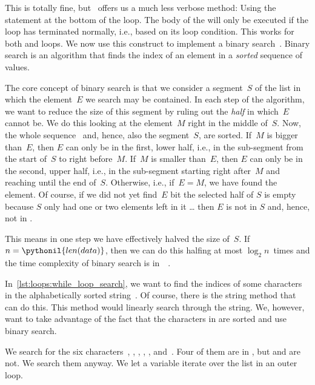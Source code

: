This is totally fine, but \python\ offers us a much less verbose method:
Using the  statement at the bottom of the loop.
The body of the  will only be executed if the loop has terminated normally, i.e., based on its loop condition.
This works for both  and  loops\cite{PSF:P3D:TPT:MCFT}.%
%
%
%
%
%
%
%
We now use this construct to implement a binary search~\cite{K1998SAS,H2024POIC:BS,B1999PP}.
Binary search is an algorithm that finds the index of an element in a \emph{sorted} sequence  of values.

The core concept of binary search is that we consider a segment~$S$ of the list in which the element~$E$ we search may be contained.
In each step of the algorithm, we want to reduce the size of this segment by ruling out the \emph{half} in which~$E$ cannot be.
We do this looking at the element~$M$ right in the middle of~$S$.
Now, the whole sequence~ and, hence, also the segment~$S$, are sorted.
If~$M$ is bigger than~$E$, then $E$ can only be in the first, lower half, i.e., in the sub-segment from the start of~$S$ to right before~$M$.
If~$M$ is smaller than~$E$, then $E$ can only be in the second, upper half, i.e., in the sub-segment starting right after~$M$ and reaching until the end of~$S$.
Otherwise, i.e., if~$E=M$, we have found the element.
Of course, if we did not yet find~$E$ bit the selected half of $S$ is empty because $S$ only had one or two elements left in it {\dots} then $E$ is not in $S$ and, hence, not in .

This means in one step we have effectively halved the size of~$S$.
If~$n=\pythonil{len(data)}$, then we can do this halfing at most $\log_2 n$~times and the time complexity of binary search is in~~\cite{K1998SAS,H2024POIC:BS,B1999PP}.%
%
\begin{sloppypar}%
In~\cref{lst:loops:while_loop_search}, we want to find the indices of some characters in the alphabetically sorted string~.
Of course, there is the string method  that can do this.
This method would linearly search through the string.
We, however, want to take advantage of the fact that the characters in  are sorted and use binary search.%
\end{sloppypar}%
%
We search for the six characters~, , , , , and~.
Four of them are in , but  and  are not.
We search them anyway.
We let a variable  iterate over the list \pythonil{["a", "c", "o", "p", "w", "z"]} in an outer loop.

